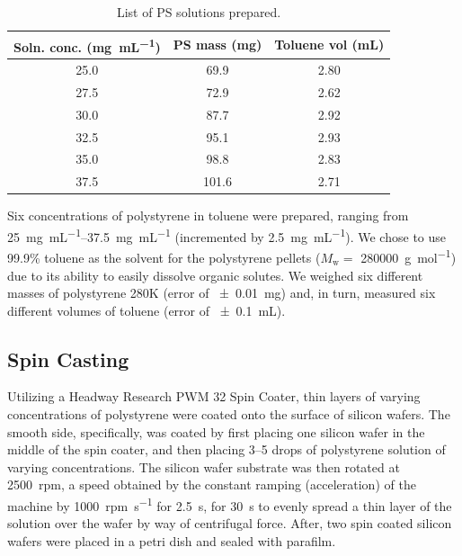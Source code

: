 \documentclass[twocolumn]{article}
\begin{document}
                \begin{table}
                    \centering
                    \begin{tabular}{@{}ccc@{}}
                        \toprule
                        Soln. conc. (\unit{\milli\gram\per\milli\liter}) & PS mass (\unit{\milli\gram}) & Toluene vol (\unit{\milli\liter}) \\ \midrule
                        25.0                           & 69.9                  & 2.80                \\
                        27.5                           & 72.9                  & 2.62                \\
                        30.0                           & 87.7                  & 2.92                \\
                        32.5                           & 95.1                  & 2.93                \\
                        35.0                           & 98.8                  & 2.83                \\
                        37.5                           & 101.6                 & 2.71                \\ \bottomrule
                    \end{tabular}
                    \caption{List of PS solutions prepared.}\label{tab:soln}
                \end{table}

                Six concentrations of polystyrene in toluene were prepared, ranging from \qtyrange{25}{37.5}{\milli\gram\per\milli\liter} (incremented by \qty{2.5}{\milli\gram\per\milli\liter}). We chose to use 99.9\% toluene as the solvent for the polystyrene pellets ($M_\text{w} = $ \qty{280000}{\gram\per\mol}) due to its ability to easily dissolve organic solutes. We weighed six different masses of polystyrene 280K (error of \qty{\pm 0.01}{\milli\gram}) and, in turn, measured six different volumes of toluene (error of \qty{\pm 0.1}{\milli\liter}).

            \subsection{Spin Casting}
                Utilizing a Headway Research PWM 32 Spin Coater, thin layers of varying concentrations of polystyrene were coated onto the surface of silicon wafers. The smooth side, specifically, was coated by first placing one silicon wafer in the middle of the spin coater, and then placing 3--5 drops of polystyrene solution of varying concentrations. The silicon wafer substrate was then rotated at \qty{2500}{rpm}, a speed obtained by the constant ramping (acceleration) of the machine by \qty{1000}{rpm\per\second} for \qty{2.5}{\second}, for \qty{30}{\second} to evenly spread a thin layer of the solution over the wafer by way of centrifugal force. After, two spin coated silicon wafers were placed in a petri dish and sealed with parafilm.
\end{document}
